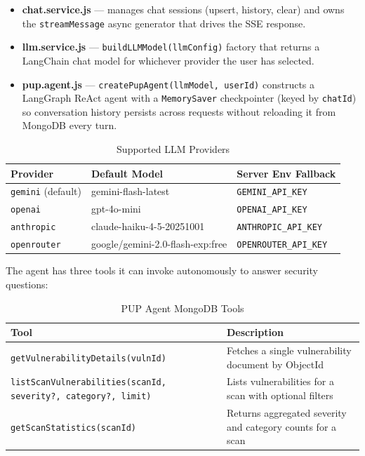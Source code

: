 \documentclass[12pt,a4paper]{report}
\begin{document}
\begin{itemize}
    \item \textbf{chat.service.js} --- manages chat sessions (upsert, history, clear) and owns the \texttt{streamMessage} async generator that drives the SSE response.
    \item \textbf{llm.service.js} --- \texttt{buildLLMModel(llmConfig)} factory that returns a LangChain chat model for whichever provider the user has selected.
    \item \textbf{pup.agent.js} --- \texttt{createPupAgent(llmModel, userId)} constructs a LangGraph ReAct agent with a \texttt{MemorySaver} checkpointer (keyed by \texttt{chatId}) so conversation history persists across requests without reloading it from MongoDB every turn.
\end{itemize}

\begin{table}[H]
\centering
\caption{Supported LLM Providers}
\label{tab:llm_providers}
\begin{tabular}{|l|l|l|}
\hline
\textbf{Provider} & \textbf{Default Model} & \textbf{Server Env Fallback} \\
\hline
\texttt{gemini} (default) & gemini-flash-latest & \texttt{GEMINI\_API\_KEY} \\
\hline
\texttt{openai} & gpt-4o-mini & \texttt{OPENAI\_API\_KEY} \\
\hline
\texttt{anthropic} & claude-haiku-4-5-20251001 & \texttt{ANTHROPIC\_API\_KEY} \\
\hline
\texttt{openrouter} & google/gemini-2.0-flash-exp:free & \texttt{OPENROUTER\_API\_KEY} \\
\hline
\end{tabular}
\end{table}

The agent has three tools it can invoke autonomously to answer security questions:

\begin{table}[H]
\centering
\caption{PUP Agent MongoDB Tools}
\label{tab:pup_agent_tools}
\begin{tabular}{|l|p{9cm}|}
\hline
\textbf{Tool} & \textbf{Description} \\
\hline
\texttt{getVulnerabilityDetails(vulnId)} & Fetches a single vulnerability document by ObjectId \\
\hline
\texttt{listScanVulnerabilities(scanId, severity?, category?, limit)} & Lists vulnerabilities for a scan with optional filters \\
\hline
\texttt{getScanStatistics(scanId)} & Returns aggregated severity and category counts for a scan \\
\hline
\end{tabular}
\end{table}
\end{document}
